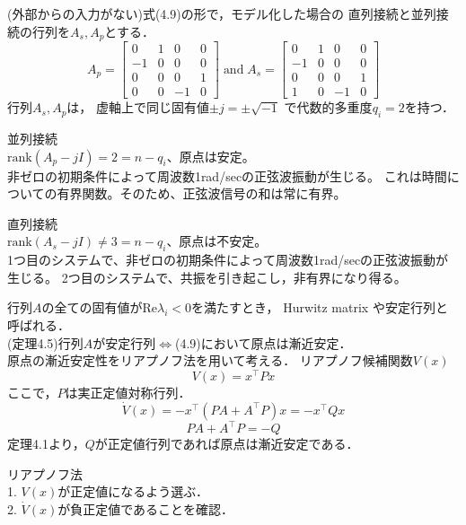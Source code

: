 \documentclass{jsarticle}
\begin{document}
(外部からの入力がない)式(4.9)の形で，モデル化した場合の
直列接続と並列接続の行列を$A_s,A_p$とする．
\begin{equation*}
  A_p = \left[\begin{matrix}
    0&1&0&0\\
    -1&0&0&0\\
    0&0&0&1\\
    0&0&-1&0
  \end{matrix}\right]\; \text{and}\;
  A_s = \left[\begin{matrix}
    0&1&0&0\\
    -1&0&0&0\\
    0&0&0&1\\
    1&0&-1&0
  \end{matrix}\right]
\end{equation*}
行列$A_s,A_p$は，
虚軸上で同じ固有値$\pm j = \pm \sqrt{-1}$
で代数的多重度$q_i = 2$を持つ．

並列接続\\
$\text{rank}(A_p-jI) =2= n-q_i$、原点は安定。\\
非ゼロの初期条件によって周波数1rad/secの正弦波振動が生じる。
これは時間についての有界関数。そのため、正弦波信号の和は常に有界。

直列接続\\
$\text{rank}(A_s-jI) \neq 3= n-q_i$、原点は不安定。\\
1つ目のシステムで、非ゼロの初期条件によって周波数1rad/secの正弦波振動が生じる。
2つ目のシステムで、共振を引き起こし，非有界になり得る。

{\color{gray}\hrulefill}

行列$A$の全ての固有値が$\text{Re}\lambda_i <0$を満たすとき，
Hurwitz matrix や安定行列と呼ばれる．\\
(定理4.5)行列$A$が安定行列$\Leftrightarrow$(4.9)において原点は漸近安定．\\
原点の漸近安定性をリアプノフ法を用いて考える．
リアプノフ候補関数$V(x)$
\begin{equation*}
  V(x) = x^\top Px
\end{equation*}
ここで，$P$は実正定値対称行列．
\begin{equation*}
  \dot V(x) = -x^\top(PA+A^\top P)x=-x^\top Qx
\end{equation*}
\begin{equation*}
  PA+A^\top P = -Q \tag{4.12}
\end{equation*}
定理4.1より，$Q$が正定値行列であれば原点は漸近安定である．

リアプノフ法\\
1. $V(x)$が正定値になるよう選ぶ．\\
2. $\dot V(x)$が負正定値であることを確認．
\end{document}
